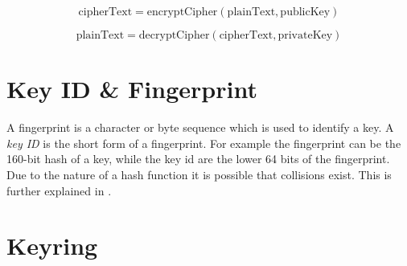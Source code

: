 \begin{equation} \label{eq:pkencrypt}
	\text{cipherText} = \text{encryptCipher}(\text{plainText}, \text{publicKey})
\end{equation}

\begin{equation} \label{eq:pkdecrypt}
	\text{plainText} = \text{decryptCipher}(\text{cipherText}, \text{privateKey})
\end{equation}






\section{Key ID \&{} Fingerprint}
\label{section:pre:keyid}

A fingerprint is a character or byte sequence which is used to identify a key.
A \textit{key ID} is the short form of a fingerprint.
For example the fingerprint can be the 160-bit  hash of a key, while the key id are the lower 64 bits of the fingerprint. Due to the nature of a hash function it is possible that collisions exist.
This is further explained in \cite[section 12.2]{RFC4880}.


\section{Keyring}
\label{section:pre:keyring}

